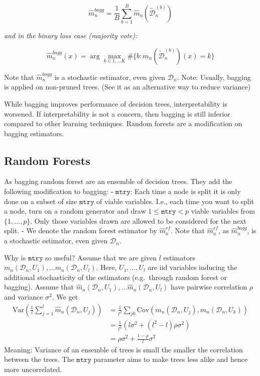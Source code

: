 \documentclass[a4paper,12pt,openany]{book}
\begin{document}
\[
\hat m^{bagg}_n=\frac 1 B \sum_{b=1}^B \hat m_n(\tilde {\mathcal D}^{(b)}_n)
\]

\emph{and in the binary loss case (majority vote):}

\[
\hat m^{bagg}_n(x)=\arg \max_{k\in {1,\dots K}} \#\{b: m_n(\tilde {\mathcal D}^{(b)}_n) (x)=k\}
\]

Note that \(\hat m^{bagg}_n\) is a stochastic estimator, even given \(\mathcal D_n\). Note: Usually, bagging is applied on non-pruned trees. (See it as an alternative way to reduce variance)

While bagging improves performance of decision trees, interpretability is worsened. If interpretability is not a concern, then bagging is still inferior compared to other learning techniques. Random forests are a modification on bagging estimators.

\hypertarget{random-forests}{%
\subsection{Random Forests}\label{random-forests}}

 As bagging random forest are an ensemble of decision trees. They add the following modification to bagging:
- \(\texttt{mtry}\): Each time a node is split it is only done on a subset of size \(\texttt{mtry}\) of viable variables. I.e., each time you want to split a node, turn on a random generator and draw \(1\leq\texttt{mtry}<p\) viable variables from \(\{1,\dots,p\}\). Only those variables drawn are allowed to be considered for the next split.
- We denote the random forest estimator by \(\hat m^{rf}_n\). Note that \(\hat m^{rf}_n\), as \(\hat m^{bagg}_n\), is a stochastic estimator, even given \(\mathcal D_n\).

Why is \(\texttt{mtry}\) so useful? Assume that we are given \(l\) estimators \(m_n(\mathcal D_n, U_1), \dots m_n(\mathcal D_n, U_l)\). Here, \(U_1,\dots, U_l\) are iid variables inducing the additional stochasticity of the estimators (e.g.~through random forest or bagging). Assume that \(\hat m_n(\mathcal D_n, U_1), \dots \hat m_n(\mathcal D_n, U_l)\) have pairwise correlation \(\rho\) and variance \(\sigma^2\). We get
\begin{align*}
\textrm{Var}\left (\frac 1 l \sum_{j=1}^l \hat m_n(\mathcal D_n, U_j)\right)&= \frac 1 {l^2} \sum_{jk} \textrm{Cov}(m_n(\mathcal D_n, U_j),m_n(\mathcal D_n, U_k))\\&=\frac 1 {l^2} \left( l\sigma^2+ (l^2-l)\rho\sigma^2\right)\\&= \rho \sigma^2 + \frac{1-\rho}{l}\sigma^2
\end{align*}
Meaning: Variance of an ensemble of trees is small the smaller the correlation between the trees. The \(\texttt{mtry}\) parameter aims to make trees less alike and hence more uncorrelated.
\end{document}
